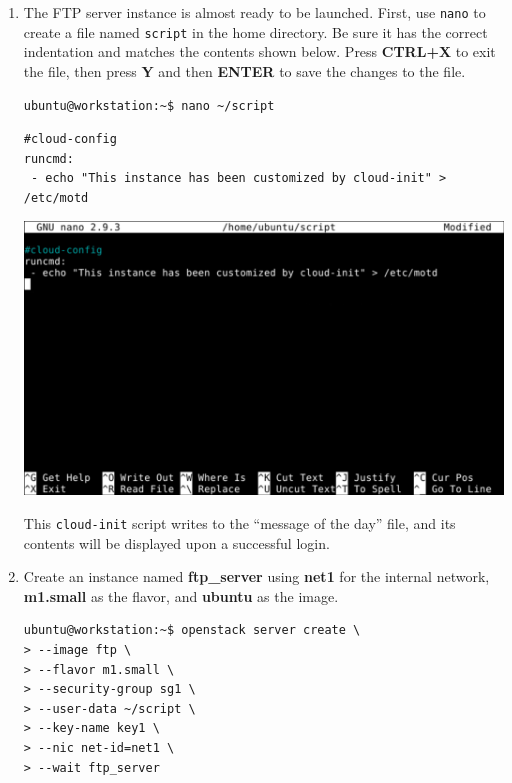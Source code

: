 \documentclass[letterpaper, 12pt]{article}
\begin{document}
\begin{enumerate}
    \item The FTP server instance is almost ready to be launched. First, use \texttt{nano} to create a file named
    \texttt{script} in the home directory. Be sure it has the correct indentation and matches the contents shown below.
    Press \textbf{CTRL+X} to exit the file, then press \textbf{Y} and then \textbf{ENTER} to save the changes to the
    file.
\begin{lstlisting}
ubuntu@workstation:~$ nano ~/script
\end{lstlisting}
\begin{lstlisting}
#cloud-config
runcmd:
 - echo "This instance has been customized by cloud-init" > /etc/motd
\end{lstlisting}

    \begin{center}
        \includegraphics[width=\linewidth]{images/part1/step34.png}
    \end{center}

    \begin{notebox}{}
        This \texttt{cloud-init} script writes to the ``message of the day'' file, and its contents will be displayed
        upon a successful login.
    \end{notebox}

    \item Create an instance named \textbf{ftp\_server} using \textbf{net1} for the internal network, \textbf{m1.small}
    as the flavor, and \textbf{ubuntu} as the image.
\begin{lstlisting}
ubuntu@workstation:~$ openstack server create \
> --image ftp \
> --flavor m1.small \
> --security-group sg1 \
> --user-data ~/script \
> --key-name key1 \
> --nic net-id=net1 \
> --wait ftp_server
\end{lstlisting}


\end{enumerate}
\end{document}
